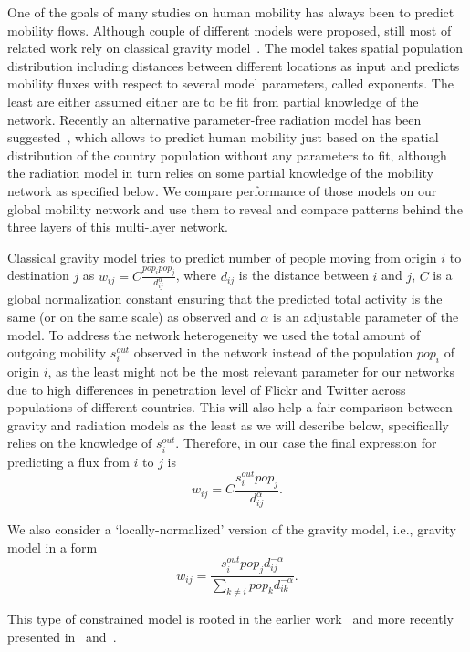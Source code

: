 \documentclass[aps,superscriptaddress,showkeys,nofootinbib]{revtex4-1}
\begin{document}
One of the goals of many studies on human mobility has always been to predict mobility flows. Although couple of different models were proposed, still most of related work rely on classical gravity model~\cite{Gravity1946Zipf,Barthelemy2011Spatial}. The model takes spatial population distribution including distances between different locations as input and predicts mobility fluxes with respect to several model parameters, called exponents. The least are either assumed either are to be fit from partial knowledge of the network. Recently an alternative  parameter-free radiation model has been suggested~\cite{RadiationModel}, which allows to predict human mobility just based on the spatial distribution of the country population without any parameters to fit, although the radiation model in turn relies on some partial knowledge of the mobility network as specified below. We compare performance of those models on our global mobility network and use them to reveal and compare patterns behind the three layers of this multi-layer network. 

Classical gravity model tries to predict number of people moving from origin $i$ to destination $j$ as $w_{ij}=C\frac{pop_i pop_j}{d_{ij}^\alpha}$, where $d_{ij}$ is the distance between $i$ and $j$, $C$ is a global normalization constant ensuring that the predicted total activity is the same (or on the same scale) as observed and $\alpha$ is an adjustable parameter of the model. To address the network heterogeneity we used the total amount of outgoing mobility $s_i^{out}$ observed in the network instead of the population $pop_i$ of origin $i$, as the least might not be the most relevant parameter for our networks due to high differences in penetration level of Flickr and Twitter across populations of different countries. This will also help a fair comparison between gravity and radiation models as the least as we will describe below, specifically relies on the knowledge of $s_i^{out}$. Therefore, in our case the final expression for predicting a flux from $i$ to $j$ is 
$$
w_{ij}=C\frac{s_i^{out} pop_j}{d_{ij}^\alpha}.
$$ 

We also consider a `locally-normalized' version of the gravity model, i.e., gravity model in a form 
$$
w_{ij}=\frac{s_i^{out} pop_j d_{ij}^{-\alpha}}{\sum_{k\ne i}pop_k d_{ik}^{-\alpha}}.
$$

This type of constrained model is rooted in the earlier work~\cite{wilson1967statistical} and more recently presented in~\cite{sagarra2013statistical} and~\cite{grauwin2015identifying}.
\end{document}
